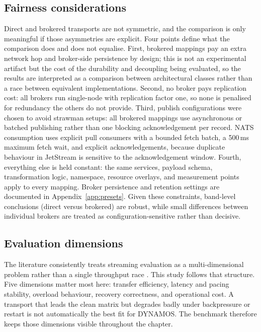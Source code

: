 \subsection{Fairness considerations}\label{sec:fairness}

Direct and brokered transports are not symmetric, and the comparison is only meaningful if those asymmetries are explicit. Four points define what the comparison does and does not equalise. First, brokered mappings pay an extra network hop and broker-side persistence by design; this is not an experimental artifact but the cost of the durability and decoupling being evaluated, so the results are interpreted as a comparison between architectural classes rather than a race between equivalent implementations. Second, no broker pays replication cost: all brokers run single-node with replication factor one, so none is penalised for redundancy the others do not provide. Third, publish configurations were chosen to avoid strawman setups: all brokered mappings use asynchronous or batched publishing rather than one blocking acknowledgement per record. NATS consumption uses explicit pull consumers with a bounded fetch batch, a 500\,ms maximum fetch wait, and explicit acknowledgements, because duplicate behaviour in JetStream is sensitive to the acknowledgement window. Fourth, everything else is held constant: the same services, payload schema, transformation logic, namespace, resource overlays, and measurement points apply to every mapping. Broker persistence and retention settings are documented in Appendix~\ref{app:presets}. Given these constraints, band-level conclusions (direct versus brokered) are robust, while small differences between individual brokers are treated as configuration-sensitive rather than decisive.

\subsection{Evaluation dimensions}

The literature consistently treats streaming evaluation as a multi-dimensional problem rather than a single throughput race \cite{coviello2022dataxc,systematicstreaming,ciftci2025ipcmechanisms}. This study follows that structure. Five dimensions matter most here: transfer efficiency, latency and pacing stability, overload behaviour, recovery correctness, and operational cost. A transport that leads the clean matrix but degrades badly under backpressure or restart is not automatically the best fit for DYNAMOS. The benchmark therefore keeps those dimensions visible throughout the chapter.

